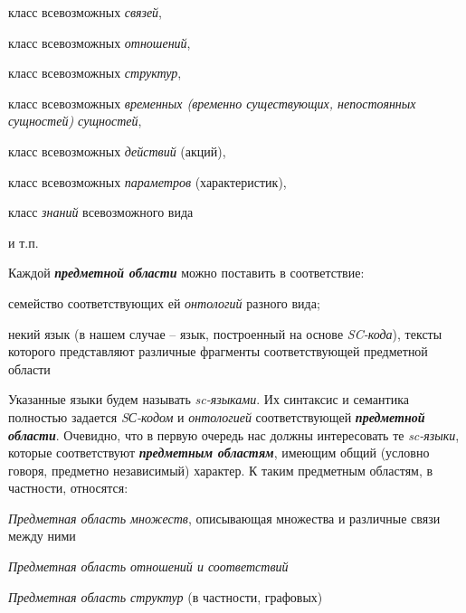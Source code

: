 \begin{SCn}
\begin{scnsubstruct}
\begin{scnsubstruct}
{\begin{scnitemize}
\begin{scnitemizeii}
                        \item класс всевозможных \textit{связей},
                        \item класс всевозможных \textit{отношений},
                        \item класс всевозможных \textit{структур},
                        \item класс всевозможных \textit{временных (временно существующих, непостоянных сущностей) сущностей},
                        \item класс всевозможных \textit{действий} (акций),
                        \item класс всевозможных \textit{параметров} (характеристик),
                        \item класс \textit{знаний} всевозможного вида
                        \item и т.п.
                    \end{scnitemizeii}
                \end{scnitemize}
                Каждой \textbf{\textit{предметной области}} можно поставить в соответствие:
                \begin{scnitemize}
                    \item семейство соответствующих ей \textit{онтологий} разного вида;
                    \item некий язык (в нашем случае -- язык, построенный на основе \textit{SC-кода}), тексты которого представляют различные фрагменты соответствующей предметной области
                \end{scnitemize}
                Указанные языки будем называть \textit{sc-языками}. Их синтаксис и семантика полностью задается \textit{SС-кодом} и \textit{онтологией} соответствующей \textbf{\textit{предметной области}}. Очевидно, что в первую очередь нас должны интересовать те \textit{sc-языки}, которые соответствуют \textbf{\textit{предметным областям}}, имеющим общий (условно говоря, предметно независимый) характер. К таким предметным областям, в частности, относятся:
                \begin{scnitemize}
                    \item \textit{Предметная область множеств}, описывающая множества и различные связи между ними
                    \item \textit{Предметная область отношений и соответствий}
                    \item \textit{Предметная область структур} (в частности, графовых)

\end{scnitemize}}
\end{scnsubstruct}
\end{scnsubstruct}
\end{SCn}
